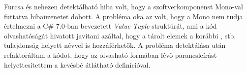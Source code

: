 Furcsa és nehezen detektálható hiba volt, hogy a szoftverkomponenst Mono-val futtatva  hibaüzenetet dobott. A probléma oka az volt, hogy a Mono nem tudja értelmezni a C\# 7.0-ban bevezetett \textit{Value Tuple} struktúrát, ami a kód olvashatóságát hivatott javítani azáltal, hogy a tárolt elemek a korábbi ,  stb. tulajdonság helyett névvel is hozzáférhetők. A probléma detektálása után refaktoráltam a kódot, hogy az olvasható  formában lévő parancsleírást helyettesítettem a kevésbé átlátható  definícióval. \\